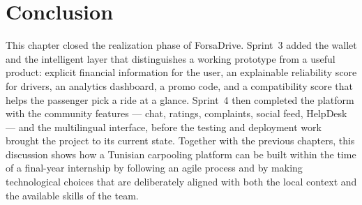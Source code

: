 \section*{Conclusion}

This chapter closed the realization phase of ForsaDrive. Sprint~3 added the wallet and the intelligent layer that distinguishes a working prototype from a useful product: explicit financial information for the user, an explainable reliability score for drivers, an analytics dashboard, a promo code, and a compatibility score that helps the passenger pick a ride at a glance. Sprint~4 then completed the platform with the community features --- chat, ratings, complaints, social feed, HelpDesk --- and the multilingual interface, before the testing and deployment work brought the project to its current state. Together with the previous chapters, this discussion shows how a Tunisian carpooling platform can be built within the time of a final-year internship by following an agile process and by making technological choices that are deliberately aligned with both the local context and the available skills of the team.
